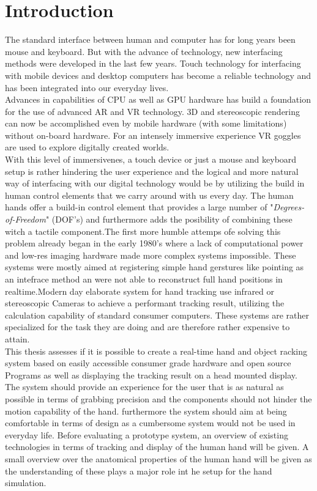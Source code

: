 \chapter{Introduction}
The standard interface between human and computer has for long years been mouse and keyboard. But with the advance of technology, new interfacing methods were developed in the last few years.
Touch technology for interfacing with mobile devices and desktop computers has become a reliable technology and has been integrated into our everyday lives.\\
Advances in capabilities of CPU as well as GPU hardware has build a foundation for the use of advanced AR and VR technology. 3D and stereoscopic rendering can now be accomplished even by mobile hardware (with some limitations) without on-board hardware. For an intensely immersive experience VR goggles are used to explore digitally created worlds.\\
With this level of immersivenes, a touch device or just a mouse and keyboard setup is rather hindering the user experience and the logical and more natural way of interfacing with our digital technology would be by utilizing the build in human control elements that we carry around with us every day. The human hands offer a build-in control element that provides a large number of "\textit{Degrees-of-Freedom}" (DOF's) and furthermore adds the posibility of combining these witch a tactile component.The first more humble attemps ofe solving this problem already began in the early 1980's where a lack of computational power and low-res imaging hardware made more complex systems impossible. These systems were mostly aimed at registering simple hand gerstures like pointing as an intefrace method an were not able to reconstruct full hand positions in realtime\cite{Bolt.1980}.Modern day elaborate system for hand tracking use infrared or stereoscopic Cameras to achieve a performant tracking result, utilizing the calculation capability of standard consumer computers. These systems are rather specialized for the task they are doing and are therefore rather expensive to attain. \\
This thesis assesses if it is possible to create a real-time hand and object racking system based on easily accessible consumer grade hardware and open source Programs as well as displaying the tracking result on a head mounted display. The system should provide an experience for the user that is as natural as possible in terms of grabbing precision and  the components should not hinder the motion capability of the hand. furthermore the system should aim at being comfortable in terms of design as a cumbersome system would not be used  in everyday life.
Before evaluating a prototype system, an overview of existing technologies in terms of tracking and display of the human hand will be given. A small overview over the anatomical properties of the human hand will be given as the understanding of these plays a major role int he setup for the hand simulation.

